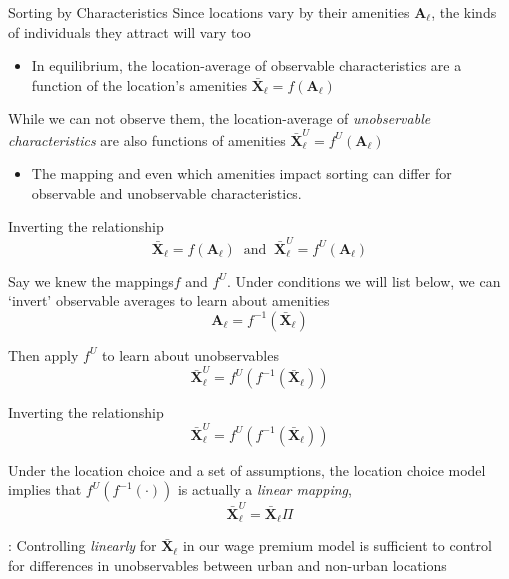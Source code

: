 \documentclass[aspectratio=169,t]{beamer}
\begin{document}
\begin{frame}{Sorting by Characteristics}
  Since locations vary by their amenities $\bm{A}_\ell$, the kinds of individuals they attract will vary too
  
  \begin{itemize}
    \item In equilibrium, the location-average of observable characteristics are a function of the location's amenities $\bar{\bm{X}}_\ell = f(\bm{A}_\ell)$
  \end{itemize}

  \pause
  \bigskip\medskip
  While we can not observe them, the location-average of \emph{unobservable characteristics} are also functions of amenities $\bar{\bm{X}}^U_\ell = f^U(\bm{A}_\ell)$
  \begin{itemize}
    \item The mapping and even which amenities impact sorting can differ for observable and unobservable characteristics.
  \end{itemize}
\end{frame}

\begin{frame}{Inverting the relationship}
  \vspace*{-1.5\bigskipamount}
  $$
    \bar{\bm{X}}_\ell = f(\bm{A}_\ell) \ \text{ and }\  \bar{\bm{X}}^U_\ell = f^U(\bm{A}_\ell)
  $$

  \medskip
  Say we knew the mappings$f$ and $f^U$. Under conditions we will list below, we can `invert' observable averages to learn about amenities
  $$
    \bm{A}_\ell = f^{-1}(\bar{\bm{X}}_\ell)
  $$

  \pause
  \bigskip
  Then apply $f^U$ to learn about unobservables
  $$
    \bar{\bm{X}}^U_\ell = f^U(f^{-1}(\bar{\bm{X}}_\ell))
  $$
\end{frame}

\begin{frame}{Inverting the relationship}
  \vspace*{-1.5\bigskipamount}
  $$
    \bar{\bm{X}}^U_\ell = f^U(f^{-1}(\bar{\bm{X}}_\ell))
  $$

  \medskip
  Under the location choice and a set of assumptions, the location choice model implies that $f^U(f^{-1}(\cdot))$ is actually a \emph{linear mapping}, 
  $$\bar{\bm{X}}^U_\ell = \bar{\bm{X}}_\ell \Pi$$

  \pause
  \bigskip
  \textbf{}: Controlling \emph{linearly} for $\bar{\bm{X}}_\ell$ in our wage premium model is sufficient to control for differences in unobservables between urban and non-urban locations
\end{frame}
\end{document}
